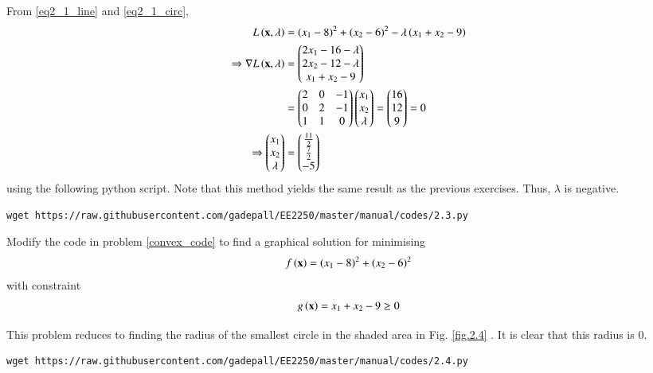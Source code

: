 \documentclass[journal,12pt,twocolumn]{IEEEtran}
\begin{document}
\solution
From \eqref{eq2_1_line} and \eqref{eq2_1_circ}, 
%
\begin{align}
L\left(\mathbf{x},\lambda\right) &= (x_1-8)^2 + (x_2-6)^2 - \lambda \left(x_1 + x_2 - 9\right) \\
\Rightarrow \nabla L\left(\mathbf{x},\lambda\right)  & = 
\begin{pmatrix}
2x_1  - 16 - \lambda \\
2x_2 - 12 - \lambda \\
x_1 + x_2 -9
\end{pmatrix}
\\
&=
\begin{pmatrix}
2 &0 & - 1 \\
0 &2 & - 1 \\
1 & 1 & 0 
\end{pmatrix}
\begin{pmatrix}
x_1 \\
x_2 \\
\lambda
\end{pmatrix}
= 
\begin{pmatrix}
16 \\
 12 \\
9
\end{pmatrix}
=
0 
\\
\Rightarrow 
\begin{pmatrix}
x_1 \\
x_2 \\
\lambda
\end{pmatrix}
&= 
\begin{pmatrix}
\frac{11}{2} \\
 \frac{7}{2} \\
-5
\end{pmatrix}
\end{align}
%
using the following python script.  Note that this method yields the same result as the previous exercises.  Thus, $\lambda$ is negative.
%	
\begin{lstlisting}
wget https://raw.githubusercontent.com/gadepall/EE2250/master/manual/codes/2.3.py
\end{lstlisting}

%
\begin{problem}
\label{ch2_constraint}
Modify the code in problem \ref{convex_code} to find a graphical solution for minimising
\begin{align}
f\left(\mathbf{x}\right) = (x_1-8)^2 + (x_2-6)^2
\end{align}
with constraint
\begin{align}
\label{convex-constraint}
g\left(\mathbf{x}\right) = x_1 + x_2 - 9 \geq 0
\end{align}
\end{problem}
\solution 
This problem reduces to finding the radius of the smallest circle in the shaded area in Fig. \ref{fig.2.4} .  It is clear that this radius is 0.
%	
\begin{lstlisting}
wget https://raw.githubusercontent.com/gadepall/EE2250/master/manual/codes/2.4.py
\end{lstlisting}
\end{document}
